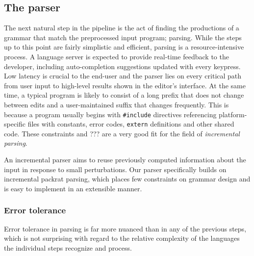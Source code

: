 \subsection{The parser}

The next natural step in the pipeline is the act of finding the productions of a
\pfs grammar that match the preprocessed input program; parsing. While the steps
up to this point are fairly simplistic and efficient, parsing is a
resource-intensive process. A language server is expected to provide real-time
feedback to the developer, including auto-completion suggestions updated with
every keypress. Low latency is crucial to the end-user and the
parser lies on every critical path from user input to high-level results shown
in the editor's interface. At the same time, a typical \pfs program is likely to
consist of a long prefix that does not change between edits and a
user-maintained suffix that changes frequently. This is because a \pfs program
usually begins with \texttt{\#include} directives referencing platform-specific
files with constants, error codes, \texttt{extern} definitions and other shared
code. These constraints and ??? are a very good fit for the
field of \emph{incremental parsing}.

An incremental parser aims to reuse previously computed information about the
input in response to small perturbations. Our parser specifically builds on
incremental packrat parsing\cite{dubroy2017incremental_packrat_parsing}, which
places few constraints on grammar design and is easy to implement in an
extensible manner.


\subsubsection*{Error tolerance}

Error tolerance in parsing is far more nuanced than in any of the previous
steps, which is not surprising with regard to the relative complexity of the
languages the individual steps recognize and process.



